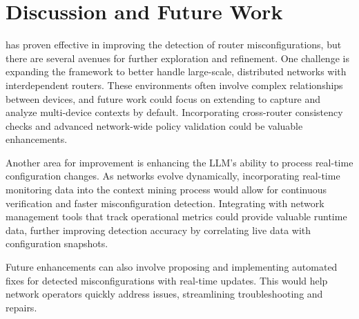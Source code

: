 \section{Discussion and Future Work}
\label{sec:future}

\sysname{} has proven effective in improving the detection of router misconfigurations, but there are several avenues for further exploration and refinement. One challenge is expanding the framework to better handle large-scale, distributed networks with interdependent routers. These environments often involve complex relationships between devices, and future work could focus on extending \sysname{} to capture and analyze multi-device contexts by default. Incorporating cross-router consistency checks and advanced network-wide policy validation could be valuable enhancements.

Another area for improvement is enhancing the LLM's ability to process real-time configuration changes. As networks evolve dynamically, incorporating real-time monitoring data into the context mining process would allow for continuous verification and faster misconfiguration detection. Integrating \sysname{} with network management tools that track operational metrics could provide valuable runtime data, further improving detection accuracy by correlating live data with configuration snapshots.

Future enhancements can also involve proposing and implementing automated fixes for detected misconfigurations with real-time updates. This would help network operators quickly address issues, streamlining troubleshooting and repairs.